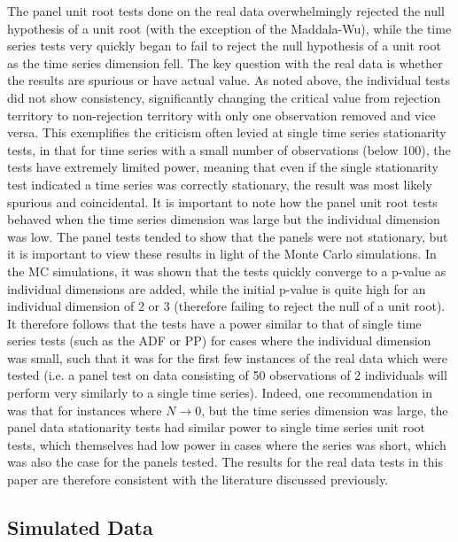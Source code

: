 The panel unit root tests done on the real data overwhelmingly rejected the null hypothesis of a unit root (with the exception of the Maddala-Wu), while the time series tests very quickly began to fail to reject the null hypothesis of a unit root as the time series dimension fell. The key question with the real data is whether the results are spurious or have actual value. As noted above, the individual tests did not show consistency, significantly changing the critical value from rejection territory to non-rejection territory with only one observation removed and vice versa. This exemplifies the criticism often levied at single time series stationarity tests, in that for time series with a small number of observations (below 100), the tests have extremely limited power, meaning that even if the single stationarity test indicated a time series was correctly stationary, the result was most likely spurious and coincidental. It is important to note how the panel unit root tests behaved when the time series dimension was large but the individual dimension was low. The panel tests tended to show that the panels were not stationary, but it is important to view these results in light of the Monte Carlo simulations. In the MC simulations, it was shown that the tests quickly converge to a p-value as individual dimensions are added, while the initial p-value is quite high for an individual dimension of 2 or 3 (therefore failing to reject the null of a unit root). It therefore follows that the tests have a power similar to that of single time series tests (such as the ADF or PP) for cases where the individual dimension was small, such that it was for the first few instances of the real data which were tested (i.e. a panel test on data consisting of 50 observations of 2 individuals will perform very similarly to a single time series). Indeed, one recommendation in \citet{llc} was that for instances where $N \to 0$, but the time series dimension was large, the panel data stationarity tests had similar power to single time series unit root tests, which themselves had low power in cases where the series was short, which was also the case for the panels tested. The results for the real data tests in this paper are therefore consistent with the literature discussed previously.

\subsection{Simulated Data}


